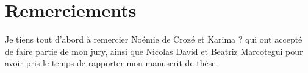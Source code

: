 

\begingroup

\let\clearpage\relax
\let\cleardoublepage\relax
\let\cleardoublepage\relax

\chapter*{Remerciements}

Je tiens tout d'abord à remercier Noémie de Crozé et Karima ? qui ont accepté de faire partie de mon jury, ainsi que Nicolas David et Beatriz Marcotegui pour avoir pris le temps de rapporter mon manuscrit de thèse.

\endgroup